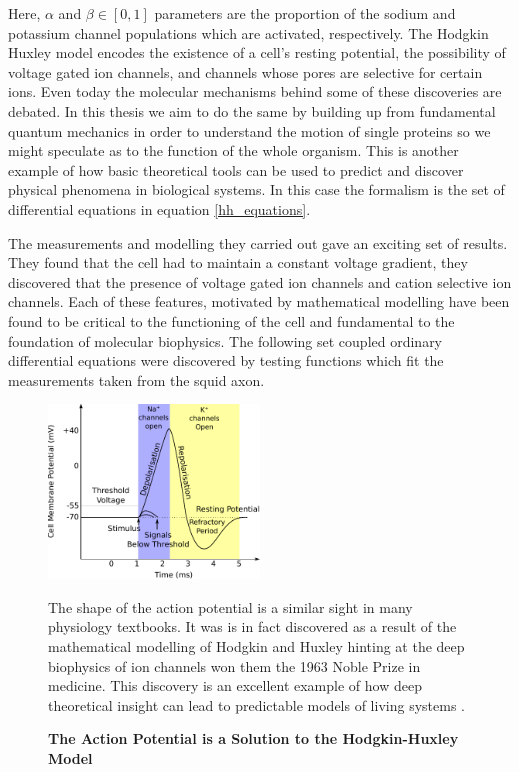 Here, $\alpha$ and $\beta \in [0,1]$ parameters are the proportion of the sodium and potassium channel populations which are activated, respectively.   The Hodgkin Huxley model encodes the existence of a cell's resting potential, the possibility of voltage gated ion channels, and channels whose pores are selective for certain ions. Even today the molecular mechanisms behind some of these discoveries are debated. In this thesis we aim to do the same by building up from fundamental quantum mechanics in order to understand the motion of single proteins so we might speculate as to the function of the whole organism. This is another example of how basic theoretical tools can be used to predict and discover physical phenomena in biological systems. In this case the formalism is the set of differential equations in equation \ref{hh_equations}.

The measurements and modelling they carried out gave an exciting set of results. They found that the cell had to maintain a constant voltage gradient, they discovered that the presence of voltage gated ion channels and cation selective ion channels\cite{hodgkin1952}. Each of these features, motivated by mathematical modelling have been found to be critical to the functioning of the cell and fundamental to the foundation of molecular biophysics. The following set coupled ordinary differential equations were discovered by testing functions which fit the measurements taken from the squid axon.   

\begin{figure}
	\begin{center}
		\includegraphics[width=0.5\textwidth]{figures/Hodgkin-Huxley_action_potential.pdf}
	\end{center}
	\captionsetup{singlelinecheck = false, justification=raggedright}
	\caption[The Action Potential is a Solution to the Hodkin-Huxley Model] {\textbf{The Action Potential is a Solution to the Hodgkin-Huxley Model }}{The shape of the action potential is a similar sight in many physiology textbooks. It was is in fact discovered as a result of the mathematical modelling of Hodgkin and Huxley hinting at the deep biophysics of ion channels won them the 1963 Noble Prize in medicine. This discovery is an excellent example of how deep theoretical insight can lead to predictable models of living systems \cite{hodgkin1952, hodgkin1952a, hodgkin1952b, hodgkin1952c, hodgkin1952d}.}
	\label{action_potential_graphic}
\end{figure}

